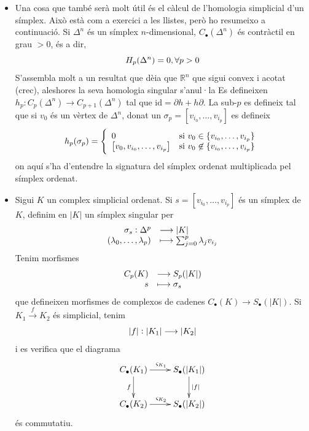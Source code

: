 \documentclass[../main.tex]{subfiles}
\begin{document}
\begin{itemize}
    \item Una cosa que també serà molt útil és el càlcul de l'homologia simplicial d'un símplex. Això està com a exercici a les llistes, però ho resumeixo a continuació. Si $\Delta^n$ és un símplex $n$-dimensional, $C_\bullet(\Delta^n)$ és contràctil en grau $>0$, és a dir,
\begin{equation}
    \notag
    H_p(\Delta^n)= 0, \forall p>0
\end{equation}
S'assembla molt a un resultat que dèia que $\mathbb{R}^n$ que sigui convex i acotat (crec), aleshores la seva homologia singular s'anul·la Es defineixen $h_p:C_p(\Delta^n)\rightarrow C_{p+1}(\Delta^n)$ tal que $\mathrm{id} = \partial h + h\partial$. La sub-$p$ es defineix tal que si $v_0$ és un vèrtex de $\Delta^n$, donat un $\sigma_p = [v_{i_0},\ldots,v_{i_p}]$ es defineix
\begin{equation}
    \notag
    h_p(\sigma_p) = \left\{
    \begin{array}{ll}
        0 & \text{si $v_0\in\{v_{i_0},\ldots,v_{i_p}\}$} \\
        \left[v_0,v_{i_0},\ldots,v_{i_p}\right] & \text{si $v_0\not\in\{v_{i_0},\ldots,v_{i_p}\}$}
    \end{array}
    \right.
\end{equation} on aquí s'ha d'entendre la signatura del símplex ordenat multiplicada pel símplex ordenat.


\item Sigui $K$ un complex simplicial ordenat. Si $s = [v_{i_0},\ldots,v_{i_p}]$ és un símplex de $K$, definim en $|K|$ un símplex singular per
\begin{equation}
    \notag
    \begin{array}{rl}
        \sigma_s:\Delta^p & \longrightarrow |K| \\
        (\lambda_0,\ldots,\lambda_p) & \longmapsto \sum_{j=0}^p\lambda_j v_{i_j}
    \end{array}
\end{equation}
Tenim morfismes
\begin{equation}
    \notag
    \begin{array}{rl}
        C_p(K) & \longrightarrow S_p(|K|) \\
        s & \longmapsto \sigma_s
    \end{array}
\end{equation}
que defineixen morfismes de complexos de cadenes $C_\bullet(K)\rightarrow S_\bullet(|K|)$. Si $K_1\overset{f}{\longrightarrow} K_2$ és simplicial, tenim 
\begin{equation}
    \notag
    |f|:|K_1|\longrightarrow |K_2|
\end{equation}
i es verifica que el diagrama
\begin{equation}
    \notag
    \xymatrix{
    C_\bullet(K_1) \ar[r]^{\varsigma_{K_1}}\ar[d]_f & S_\bullet(|K_1|) \ar[d]^{|f|} \\
    C_\bullet(K_2)\ar[r]^{\varsigma_{K_2}} & S_\bullet(|K_2|)
    }
\end{equation}
és commutatiu.
\end{itemize}
\end{document}

